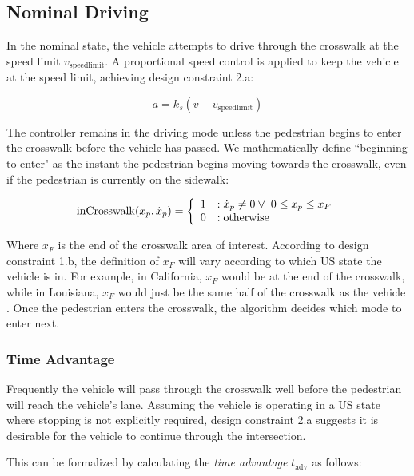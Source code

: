 \documentclass[letterpaper, 10 pt, conference]{ieeeconf} %
\begin{document}
\subsection{Nominal Driving}
In the nominal state, the vehicle attempts to drive through the crosswalk at the speed limit $v_\mathrm{speedlimit}$. A proportional speed control is applied to keep the vehicle at the speed limit, achieving design constraint 2.a:

\begin{equation}
	a = k_s(v - v_\mathrm{speedlimit})
\end{equation}

The controller remains in the driving mode unless the pedestrian begins to enter the crosswalk before the vehicle has passed. We mathematically define ``beginning to enter" as the instant the pedestrian begins moving towards the crosswalk, even if the pedestrian is currently on the sidewalk:

\begin{equation}
\label{eq:crossing}
\mathrm{inCrosswalk}(x_p, 
\dot{x}_p) = \left\{
 \begin{array}{ll}
  1&: \dot{x}_p \neq 0 \vee \hspace{1 mm} 0 \leq x_p \leq x_F \\
  0&: \mathrm{otherwise} 
 \end{array}
\right.
\end{equation}

 Where $x_F$ is the end of the crosswalk area of interest. According to design constraint 1.b, the definition of $x_F$ will vary according to which US state the vehicle is in. For example, in California, $x_F$ would be at the end of the crosswalk, while in Louisiana, $x_F$ would just be the same half of the crosswalk as the vehicle \cite{Legislatures2018}. Once the pedestrian enters the crosswalk, the algorithm decides which mode to enter next. 

\subsubsection{Time Advantage}

Frequently the vehicle will pass through the crosswalk well before the pedestrian will reach the vehicle's lane. Assuming the vehicle is operating in a US state where stopping is not explicitly required, design constraint 2.a suggests it is desirable for the vehicle to continue through the intersection.

This can be formalized by calculating the \textit{time advantage} $t_\mathrm{adv}$ \cite{Chen} as follows:
\end{document}

